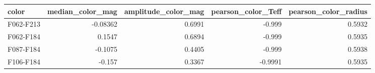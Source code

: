 \begin{tabular}{lrrrr}
\toprule
color & median_color_mag & amplitude_color_mag & pearson_color_Teff & pearson_color_radius \\
\midrule
F062-F213 & -0.08362 & 0.6991 & -0.999 & 0.5932 \\
F062-F184 & 0.1547 & 0.6894 & -0.999 & 0.5935 \\
F087-F184 & -0.1075 & 0.4405 & -0.999 & 0.5938 \\
F106-F184 & -0.157 & 0.3367 & -0.9991 & 0.5935 \\
\bottomrule
\end{tabular}
